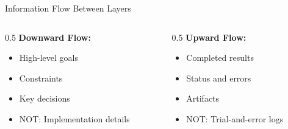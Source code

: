 \documentclass[aspectratio=169,11pt]{beamer}
\begin{document}
\begin{frame}{Information Flow Between Layers}
    \begin{columns}[T]
        \begin{column}{0.5\textwidth}
            \textbf{Downward Flow:}
            \begin{itemize}
                \item High-level goals
                \item Constraints
                \item Key decisions
                \item NOT: Implementation details
            \end{itemize}
        \end{column}
        \begin{column}{0.5\textwidth}
            \textbf{Upward Flow:}
            \begin{itemize}
                \item Completed results
                \item Status and errors
                \item Artifacts
                \item NOT: Trial-and-error logs
            \end{itemize}
        \end{column}
    \end{columns}
\end{frame}
\end{document}
